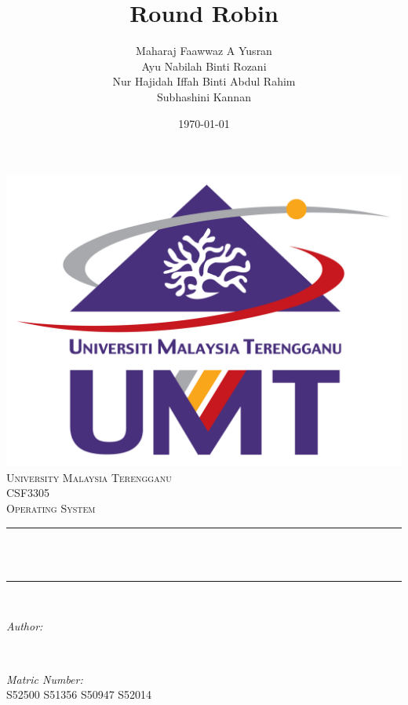 \documentclass[12pt]{article}
\title{Round Robin}								%
\author{Maharaj Faawwaz A Yusran\\ Ayu Nabilah Binti Rozani\\ Nur Hajidah Iffah Binti Abdul Rahim\\ Subhashini Kannan}								%
\date{\today}											%
\makeatletter
\let\thetitle\@title
\let\theauthor\@author
\makeatother
\begin{document}

\begin{titlepage}
	\centering
    \vspace*{0.5 cm}
    \includegraphics[scale = 0.25]{logoumt.png}\\[1.0 cm]	%
    \textsc{\LARGE University Malaysia Terengganu}\\[1.0 cm]	%
	\textsc{\Large CSF3305}\\[0.4 cm]				%
	\textsc{\large Operating System}\\[0.6 cm]				%
	\rule{\linewidth}{0.2 mm} \\[0.4 cm]
	{ \huge \bfseries \thetitle}\\
	\rule{\linewidth}{0.2 mm} \\[1.5 cm]
	
	\begin{minipage}{0.75\textwidth}
		\begin{flushleft} \large
			\emph{Author:}\\
			\theauthor
			\end{flushleft}
			\end{minipage}~
			\begin{minipage}{0.3\textwidth}
			\begin{flushleft} \large
			\emph{Matric Number:} \\
			       S52500\newline
			       S51356\newline
						 S50947\newline
						 S52014\newline %
		\end{flushleft}
	\end{minipage}\\[3 cm]
 
	\vfill
	
\end{titlepage}
\end{document}
